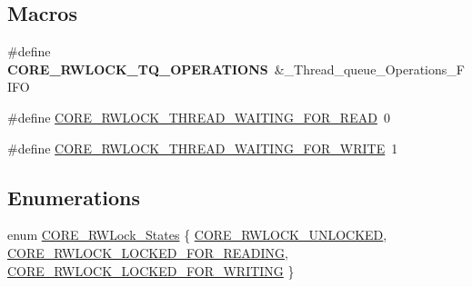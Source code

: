 \subsection*{Macros}
\begin{DoxyCompactItemize}
\item 
\mbox{\label{group__RTEMSScoreRWLock_gad29d16bc2670176146ae0ab2e15c7d88}} 
\#define {\bfseries C\+O\+R\+E\+\_\+\+R\+W\+L\+O\+C\+K\+\_\+\+T\+Q\+\_\+\+O\+P\+E\+R\+A\+T\+I\+O\+NS}~\&\+\_\+\+Thread\+\_\+queue\+\_\+\+Operations\+\_\+\+F\+I\+FO
\item 
\#define \mbox{\hyperlink{group__RTEMSScoreRWLock_gac88a0cdbbcd081c7287cc519159b1727}{C\+O\+R\+E\+\_\+\+R\+W\+L\+O\+C\+K\+\_\+\+T\+H\+R\+E\+A\+D\+\_\+\+W\+A\+I\+T\+I\+N\+G\+\_\+\+F\+O\+R\+\_\+\+R\+E\+AD}}~0
\item 
\#define \mbox{\hyperlink{group__RTEMSScoreRWLock_ga8612b7e5043e144b2479ec212ab9f820}{C\+O\+R\+E\+\_\+\+R\+W\+L\+O\+C\+K\+\_\+\+T\+H\+R\+E\+A\+D\+\_\+\+W\+A\+I\+T\+I\+N\+G\+\_\+\+F\+O\+R\+\_\+\+W\+R\+I\+TE}}~1
\end{DoxyCompactItemize}
\subsection*{Enumerations}
\begin{DoxyCompactItemize}
\item 
enum \mbox{\hyperlink{group__RTEMSScoreRWLock_ga52fe4c69d9a2c96c1022416e951b90ec}{C\+O\+R\+E\+\_\+\+R\+W\+Lock\+\_\+\+States}} \{ \mbox{\hyperlink{group__RTEMSScoreRWLock_gga52fe4c69d9a2c96c1022416e951b90eca37f524eda03289469ec16f5bbc3c5894}{C\+O\+R\+E\+\_\+\+R\+W\+L\+O\+C\+K\+\_\+\+U\+N\+L\+O\+C\+K\+ED}}, 
\mbox{\hyperlink{group__RTEMSScoreRWLock_gga52fe4c69d9a2c96c1022416e951b90eca64487dead329b89a8858d0d9c7a233c0}{C\+O\+R\+E\+\_\+\+R\+W\+L\+O\+C\+K\+\_\+\+L\+O\+C\+K\+E\+D\+\_\+\+F\+O\+R\+\_\+\+R\+E\+A\+D\+I\+NG}}, 
\mbox{\hyperlink{group__RTEMSScoreRWLock_gga52fe4c69d9a2c96c1022416e951b90eca9fd06ece1cb4617cf7c0209d439c020f}{C\+O\+R\+E\+\_\+\+R\+W\+L\+O\+C\+K\+\_\+\+L\+O\+C\+K\+E\+D\+\_\+\+F\+O\+R\+\_\+\+W\+R\+I\+T\+I\+NG}}
 \}
\end{DoxyCompactItemize}
